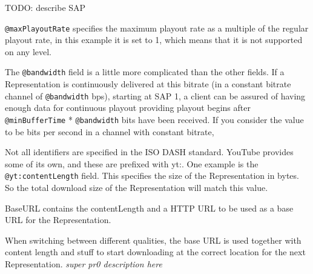 TODO: describe SAP

\texttt{@maxPlayoutRate} specifies the maximum playout rate as a multiple of the
regular playout rate, in this example it is set to 1, which means that
it is not supported on any level.

The \texttt{@bandwidth} field is a little more complicated than the other fields.
If a Representation is continuously delivered at this bitrate (in a
constant bitrate channel of \texttt{@bandwidth} bps), starting at SAP 1, a client
can be assured of having enough data for continuous playout providing
playout begins after \texttt{@minBufferTime} * \texttt{@bandwidth} bits have been
received. If you consider the value to be bits per second in a channel
with constant bitrate,

Not all identifiers are specified in the ISO DASH standard. YouTube
provides some of its own, and these are prefixed with yt:. One example
is the \texttt{@yt:contentLength} field. This specifies the size of the
Representation in bytes. So the total download size of the
Representation will match this value.

BaseURL contains the contentLength and a HTTP URL to be used as a base
URL for the Representation.

When switching between different qualities, the base URL is used
together with content length and stuff to start downloading at the
correct location for the next Representation. \emph{super pr0
description here}

